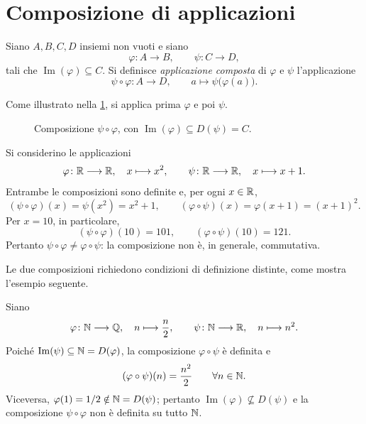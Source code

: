 \section{Composizione di applicazioni}
\label{sec:lez09-composizione}

\begin{definition}
\label{def:lez09-composizione}
Siano \(A,B,C,D\) insiemi non vuoti e siano
\[
  \varphi\colon A\longrightarrow B,
  \qquad \psi\colon C\longrightarrow D,
\]
tali che \(\operatorname{Im}(\varphi)\subseteq C\).
Si definisce \emph{applicazione composta} di \(\varphi\)
e \(\psi\) l'applicazione
\[
  \psi\circ\varphi\colon A\longrightarrow D,
  \qquad a\longmapsto\psi\bigl(\varphi(a)\bigr).
\]
\end{definition}

Come illustrato nella \cref{fig:lez09-composizione},
si applica prima \(\varphi\) e poi \(\psi\).

\begin{figure}[htbp]
  \centering
  
  \caption{Composizione \(\psi\circ\varphi\), con
  \(\operatorname{Im}(\varphi)\subseteq D(\psi)=C\).}
  \label{fig:lez09-composizione}
\end{figure}

\begin{example}
\label{ex:lez09-ordine-composizione}
Si considerino le applicazioni
\[
  \varphi\colon\mathbb{R}\longrightarrow\mathbb{R},
  \quad x\longmapsto x^2,
  \qquad
  \psi\colon\mathbb{R}\longrightarrow\mathbb{R},
  \quad x\longmapsto x+1.
\]
Entrambe le composizioni sono definite e, per ogni \(x\in\mathbb{R}\),
\[
  (\psi\circ\varphi)(x)=\psi(x^2)=x^2+1,
  \qquad
  (\varphi\circ\psi)(x)=\varphi(x+1)=(x+1)^2.
\]
Per \(x=10\), in particolare,
\[
  (\psi\circ\varphi)(10)=101,
  \qquad
  (\varphi\circ\psi)(10)=121.
\]
Pertanto \(\psi\circ\varphi\ne\varphi\circ\psi\):
la composizione non è, in generale, commutativa.
\end{example}

Le due composizioni richiedono condizioni di definizione
distinte, come mostra l'esempio seguente.

\clearpage

\begin{example}
\label{ex:lez09-composizione-non-definita}
Siano
\[
  \varphi\colon\mathbb{N}\longrightarrow\mathbb{Q},
  \quad n\longmapsto\frac n2,
  \qquad
  \psi\colon\mathbb{N}\longrightarrow\mathbb{R},
  \quad n\longmapsto n^2.
\]
Poiché \(\operatorname{Im}(\psi)\subseteq\mathbb{N}=D(\varphi)\),
la composizione \(\varphi\circ\psi\) è definita e
\[
  (\varphi\circ\psi)(n)=\frac{n^2}{2}
  \qquad\forall n\in\mathbb{N}.
\]
Viceversa, \(\varphi(1)=1/2\notin\mathbb{N}=D(\psi)\);
pertanto \(\operatorname{Im}(\varphi)\not\subseteq D(\psi)\)
e la composizione \(\psi\circ\varphi\) non è definita
su tutto \(\mathbb{N}\).
\end{example}


